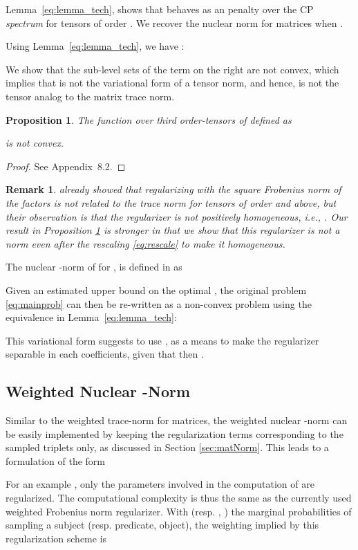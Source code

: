 \documentclass{article}
\newtheorem{proposition}{Proposition}
\newtheorem{remark}{Remark}
\begin{document}
Lemma~\ref{eq:lemma_tech}, shows that  behaves as an  penalty over the CP \emph{spectrum} for tensors of order . We recover the nuclear norm for matrices when .

Using Lemma~\ref{eq:lemma_tech}, we have :


We show that the sub-level sets of the term on the right are not convex, which implies that  is not the variational form of a tensor norm, and hence, is not the tensor analog to the matrix trace norm.

\begin{proposition}
\label{prop:notanorm}
The function over third order-tensors of   defined as

is not convex.
\end{proposition}
\begin{proof}
See Appendix~8.2.
\end{proof}
\begin{remark}
\citet[Appendix 
D]{cheng_scalable_2016} already showed that regularizing with the square Frobenius norm of the factors is not related to the trace norm for tensors of order  and above, but their observation is that the regularizer is not positively homogeneous, i.e., . Our result in Proposition \ref{prop:notanorm} is stronger in that we show that this regularizer is not a norm even after the rescaling \eqref{eq:rescale} to make it homogeneous.
\end{remark}
The nuclear -norm of  for , is defined in \citet{friedland_nuclear_2014} as

Given an estimated upper bound on the optimal , the original problem \eqref{eq:mainprob} can then be re-written as a non-convex problem using the equivalence in Lemma~\ref{eq:lemma_tech}:


This variational form suggests to use , as a means to make the regularizer separable in each coefficients, given that then . 

\subsection{Weighted Nuclear -Norm}

Similar to the weighted trace-norm for matrices, the weighted nuclear -norm can be easily implemented by keeping the regularization terms corresponding to the sampled triplets only, as discussed in Section \ref{sec:matNorm}. This leads to a formulation of the form 

For an example , only the parameters involved in the computation of  are regularized. The computational complexity is thus the same as the currently used weighted Frobenius norm regularizer. With  (resp. , ) the marginal probabilities of sampling a subject (resp. predicate, object), the weighting implied by this regularization scheme is 
\end{document}
